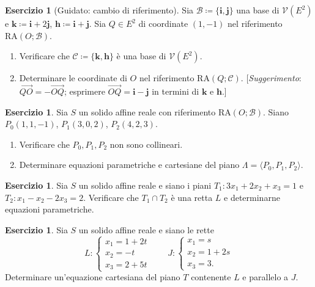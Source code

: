 \documentclass[11pt, a4paper]{book}
\theoremstyle{definition}
\newtheorem{esercizio}[definizione]{Esercizio}
\theoremstyle{plain}
\theoremstyle{remark}
\newcommand{\VV}{\mathcal{V}}   %
\newcommand{\RA}{\mathrm{RA}}   %
\begin{document}
\begin{esercizio}[Guidato: cambio di riferimento]
Sia $\mathcal{B} \coloneqq \{\mathbf{i}, \mathbf{j}\}$ una base di $\VV(E^2)$ e $\mathbf{k} \coloneqq \mathbf{i} + 2\mathbf{j}$, $\mathbf{h} \coloneqq \mathbf{i} + \mathbf{j}$. Sia $Q \in E^2$ di coordinate $(1,-1)$ nel riferimento $\RA(O;\mathcal{B})$.
\begin{enumerate}
  \item Verificare che $\mathcal{C} \coloneqq \{\mathbf{k}, \mathbf{h}\}$ è una base di $\VV(E^2)$.
  \item Determinare le coordinate di $O$ nel riferimento $\RA(Q;\mathcal{C})$. [\emph{Suggerimento}: $\overrightarrow{QO} = -\overrightarrow{OQ}$; esprimere $\overrightarrow{OQ} = \mathbf{i} - \mathbf{j}$ in termini di $\mathbf{k}$ e $\mathbf{h}$.]
\end{enumerate}
\end{esercizio}

\begin{esercizio}
Sia $S$ un solido affine reale con riferimento $\RA(O;\mathcal{B})$. Siano $P_0(1,1,-1)$, $P_1(3,0,2)$, $P_2(4,2,3)$.
\begin{enumerate}
  \item Verificare che $P_0, P_1, P_2$ non sono collineari.
  \item Determinare equazioni parametriche e cartesiane del piano $\Lambda = \langle P_0, P_1, P_2 \rangle$.
\end{enumerate}
\end{esercizio}

\begin{esercizio}
Sia $S$ un solido affine reale e siano i piani $T_1 \colon 3x_1 + 2x_2 + x_3 = 1$ e $T_2 \colon x_1 - x_2 - 2x_3 = 2$. Verificare che $T_1 \cap T_2$ è una retta $L$ e determinarne equazioni parametriche.
\end{esercizio}

\begin{esercizio}
Sia $S$ un solido affine reale e siano le rette
\[
  L\colon \begin{cases} x_1 = 1+2t \\ x_2 = -t \\ x_3 = 2+5t \end{cases} \qquad J\colon \begin{cases} x_1 = s \\ x_2 = 1+2s \\ x_3 = 3. \end{cases}
\]
Determinare un'equazione cartesiana del piano $T$ contenente $L$ e parallelo a $J$.
\end{esercizio}
\end{document}
